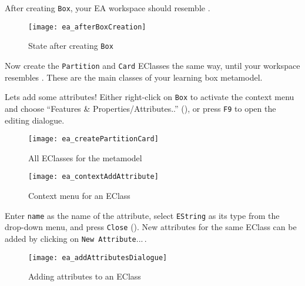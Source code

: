 \begin{stepbystep}
\item After creating \texttt{Box}, your EA workspace should resemble .

\vspace{0.5cm}

\begin{figure}[htbp]
	\centering
  \texttt{[image: ea\_afterBoxCreation]}
	\caption{State after creating \texttt{Box}}
	\label{ea:eclass_completed}
\end{figure}

\item Now create the \texttt{Partition} and \texttt{Card} EClasses the same way, until your workspace resembles
. These are the main classes of your learning box metamodel.

\vspace{0.5cm}

\item Lets add some attributes! Either right-click on \texttt{Box} to activate the context menu and choose ``Features \&
Properties/Attributes..'' (), or press \texttt{F9} to open the editing dialogue.

\begin{figure}[htbp]
	\centering
  \texttt{[image: ea\_createPartitionCard]}
	\caption{All EClasses for the metamodel}
	\label{ea:all_eclasses}
\end{figure}

\begin{figure}[htbp]
	\centering
  \texttt{[image: ea\_contextAddAttribute]}
	\caption{Context menu for an EClass}
	\label{ea:attribute}
\end{figure}
\FloatBarrier

\item Enter \texttt{name} as the name of the attribute, select \texttt{EString} as its type from the drop-down menu, and press
\texttt{Close} (). New attributes for the same EClass can be added by clicking on \texttt{New Attribute}...\,.

\vspace{1.0cm}

\begin{figure}[htbp]
	\centering
  \texttt{[image: ea\_addAttributesDialogue]}
	\caption{Adding attributes to an EClass}
	\label{ea:attribute_properties}
\end{figure}

\vspace{0.5cm}


\end{stepbystep}
